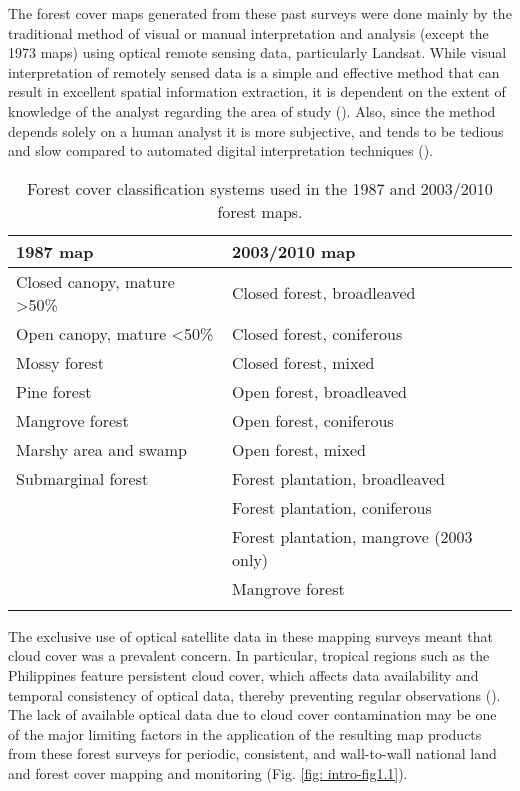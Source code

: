 The forest cover maps generated from these past surveys were done mainly by the traditional method of visual or manual interpretation and analysis (except the 1973 maps) using optical remote sensing data, particularly Landsat. While visual interpretation of remotely sensed data is a simple and effective method that can result in excellent spatial information extraction, it is dependent on the extent of knowledge of the analyst regarding the area of study (\cite{bhatta_research_2013}). Also, since the method depends solely on a human analyst it is more subjective, and tends to be tedious and slow compared to automated digital interpretation techniques (\cite{horning_remote_2010}).\\

\begin{spacing}{1.0}
\begin{longtable}[h!]{ p{7cm} p{7cm} }

    \caption[Forest cover classification systems used in the 1987, 2003, 2010 maps.]{Forest cover classification systems used in the 1987 and 2003/2010 forest maps.}
    \label{tab: intro-table1.2}\\
    
    	\toprule
    	1987 map & 2003/2010 map\\ 
    	\midrule
    	\endhead
    	
		Closed canopy, mature \textgreater 50\% & Closed forest, broadleaved\\
		Open canopy, mature \textless 50\% & Closed forest, coniferous\\
		Mossy forest & Closed forest, mixed\\
		Pine forest & Open forest, broadleaved\\
		Mangrove forest & Open forest, coniferous\\
		Marshy area and swamp & Open forest, mixed\\
		Submarginal forest & Forest plantation, broadleaved\\ 
		{} & Forest plantation, coniferous\\
		{} & Forest plantation, mangrove (2003 only)\\ 
		{} & Mangrove forest\\ 

    	\bottomrule \\
    
\end{longtable}	
\end{spacing}

The exclusive use of optical satellite data in these mapping surveys meant that cloud cover was a prevalent concern. In particular, tropical regions such as the Philippines feature persistent cloud cover, which affects data availability and temporal consistency of optical data, thereby preventing regular observations (\cite{myers_tropical_1988}). The lack of available optical data due to cloud cover contamination may be one of the major limiting factors in the application of the resulting map products from these forest surveys for periodic, consistent, and wall-to-wall national land and forest cover mapping and monitoring (Fig. \ref{fig: intro-fig1.1}).

